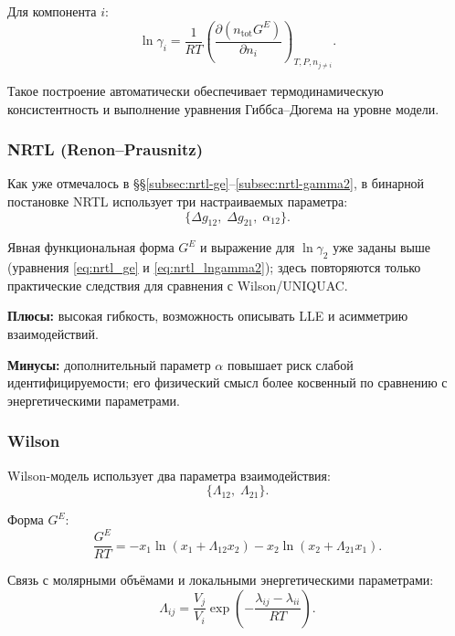 \documentclass[11pt]{article}
\begin{document}
Для компонента $i$:
\begin{equation*}
\ln\gamma_i = \frac{1}{RT}\left(\frac{\partial(n_{\text{tot}}G^E)}{\partial n_i}\right)_{T,P,n_{j\neq i}}.
\end{equation*}

Такое построение автоматически обеспечивает термодинамическую консистентность и выполнение уравнения Гиббса--Дюгема на уровне модели.

\subsubsection{NRTL (Renon--Prausnitz)}

Как уже отмечалось в §§\ref{subsec:nrtl-ge}--\ref{subsec:nrtl-gamma2}, в бинарной постановке NRTL использует три настраиваемых параметра:
\begin{equation*}
\{\Delta g_{12},\; \Delta g_{21},\; \alpha_{12}\}.
\end{equation*}

Явная функциональная форма $G^E$ и выражение для $\ln\gamma_2$ уже заданы выше (уравнения \eqref{eq:nrtl_ge} и \eqref{eq:nrtl_lngamma2}); здесь повторяются только практические следствия для сравнения с Wilson/UNIQUAC.

\textbf{Плюсы:} высокая гибкость, возможность описывать LLE и асимметрию взаимодействий.

\textbf{Минусы:} дополнительный параметр $\alpha$ повышает риск слабой идентифицируемости; его физический смысл более косвенный по сравнению с энергетическими параметрами.

\subsubsection{Wilson}

Wilson-модель использует два параметра взаимодействия:
\begin{equation*}
\{\Lambda_{12},\; \Lambda_{21}\}.
\end{equation*}

Форма $G^E$:
\begin{equation*}
\frac{G^E}{RT} = -x_1\ln(x_1+\Lambda_{12}x_2) - x_2\ln(x_2+\Lambda_{21}x_1).
\end{equation*}

Связь с молярными объёмами и локальными энергетическими параметрами:
\begin{equation*}
\Lambda_{ij}=\frac{V_j}{V_i}\exp\!\left(-\frac{\lambda_{ij}-\lambda_{ii}}{RT}\right).
\end{equation*}
\end{document}
